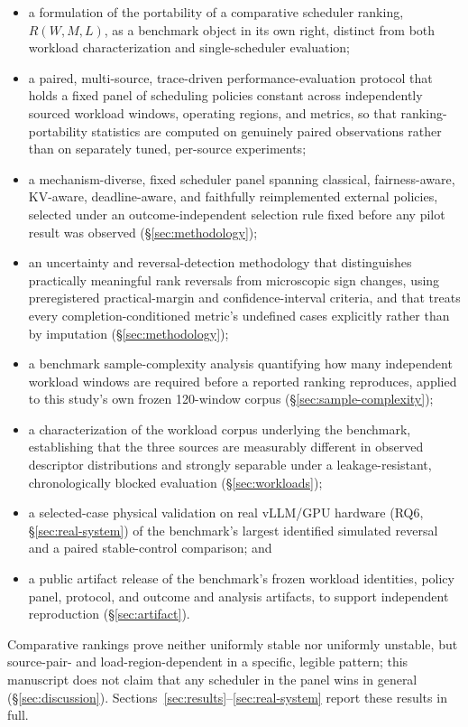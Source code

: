 \begin{itemize}
  \item a formulation of the portability of a comparative scheduler
    ranking, $R(W, M, L)$, as a benchmark object in its own right, distinct
    from both workload characterization and single-scheduler evaluation;
  \item a paired, multi-source, trace-driven performance-evaluation
    protocol that holds a fixed
    panel of scheduling policies constant across independently sourced
    workload windows, operating regions, and metrics, so that
    ranking-portability statistics are computed on genuinely paired
    observations rather than on separately tuned, per-source experiments;
  \item a mechanism-diverse, fixed scheduler panel spanning classical,
    fairness-aware, KV-aware, deadline-aware, and faithfully reimplemented
    external policies, selected under an outcome-independent selection
    rule fixed before any pilot result was observed
    (\S\ref{sec:methodology});
  \item an uncertainty and reversal-detection methodology that
    distinguishes practically meaningful rank reversals from microscopic
    sign changes, using preregistered practical-margin and
    confidence-interval criteria, and that treats every
    completion-conditioned metric's undefined cases explicitly rather than
    by imputation (\S\ref{sec:methodology});
  \item a benchmark sample-complexity analysis quantifying how many
    independent workload windows are required before a reported ranking
    reproduces, applied to this study's own frozen 120-window corpus
    (\S\ref{sec:sample-complexity});
  \item a characterization of the workload corpus underlying the
    benchmark, establishing that the three sources are measurably
    different in observed descriptor distributions and strongly separable
    under a leakage-resistant, chronologically blocked evaluation
    (\S\ref{sec:workloads});
  \item a selected-case physical validation on real vLLM/GPU hardware
    (RQ6, \S\ref{sec:real-system}) of the benchmark's largest identified
    simulated reversal and a paired stable-control comparison; and
  \item a public artifact release of the benchmark's frozen workload
    identities, policy panel, protocol, and outcome and analysis
    artifacts, to support independent reproduction (\S\ref{sec:artifact}).
\end{itemize}

Comparative rankings prove neither uniformly stable nor uniformly
unstable, but source-pair- and load-region-dependent in a specific,
legible pattern; this manuscript does not claim that any scheduler in the
panel wins in general (\S\ref{sec:discussion}). Sections~\ref{sec:results}--\ref{sec:real-system}
report these results in full.
